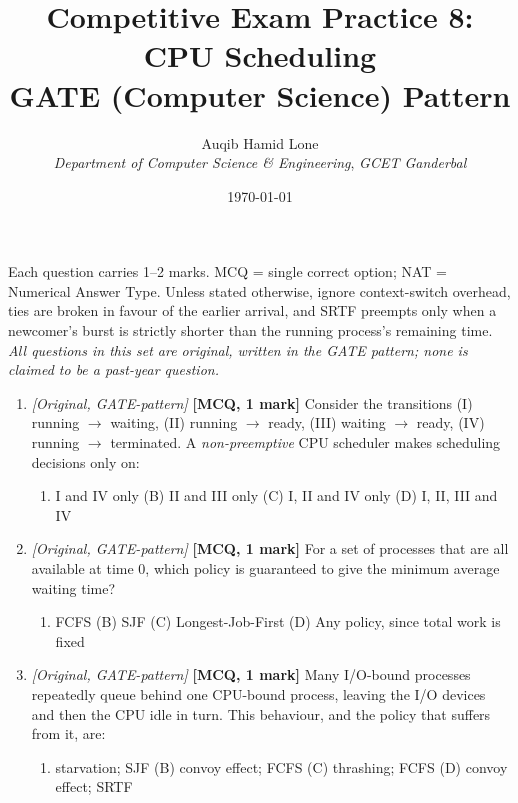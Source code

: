 \documentclass[11pt]{article}
\title{Competitive Exam Practice 8: CPU Scheduling\\\large GATE (Computer Science) Pattern}
\author{Auqib Hamid Lone\\[0.3em]
  \emph{Department of Computer Science \& Engineering}, \emph{GCET Ganderbal}}
\date{\today}
\begin{document}
\maketitle

\noindent Each question carries 1--2 marks. MCQ = single correct option; NAT = Numerical Answer Type. Unless stated otherwise, ignore context-switch overhead, ties are broken in favour of the earlier arrival, and SRTF preempts only when a newcomer's burst is strictly shorter than the running process's remaining time. \emph{All questions in this set are original, written in the GATE pattern; none is claimed to be a past-year question.}

\begin{enumerate}
\item[\textbf{Q1}] \textit{[Original, GATE-pattern]} \textbf{[MCQ, 1 mark]} Consider the transitions (I) running $\to$ waiting, (II) running $\to$ ready, (III) waiting $\to$ ready, (IV) running $\to$ terminated. A \emph{non-preemptive} CPU scheduler makes scheduling decisions only on:
\begin{enumerate}
  \item[(A)] I and IV only \quad (B) II and III only \quad (C) I, II and IV only \quad (D) I, II, III and IV
\end{enumerate}

\item[\textbf{Q2}] \textit{[Original, GATE-pattern]} \textbf{[MCQ, 1 mark]} For a set of processes that are all available at time 0, which policy is guaranteed to give the minimum average waiting time?
\begin{enumerate}
  \item[(A)] FCFS \quad (B) SJF \quad (C) Longest-Job-First \quad (D) Any policy, since total work is fixed
\end{enumerate}

\item[\textbf{Q3}] \textit{[Original, GATE-pattern]} \textbf{[MCQ, 1 mark]} Many I/O-bound processes repeatedly queue behind one CPU-bound process, leaving the I/O devices and then the CPU idle in turn. This behaviour, and the policy that suffers from it, are:
\begin{enumerate}
  \item[(A)] starvation; SJF \quad (B) convoy effect; FCFS \quad (C) thrashing; FCFS \quad (D) convoy effect; SRTF
\end{enumerate}


\end{enumerate}
\end{document}

